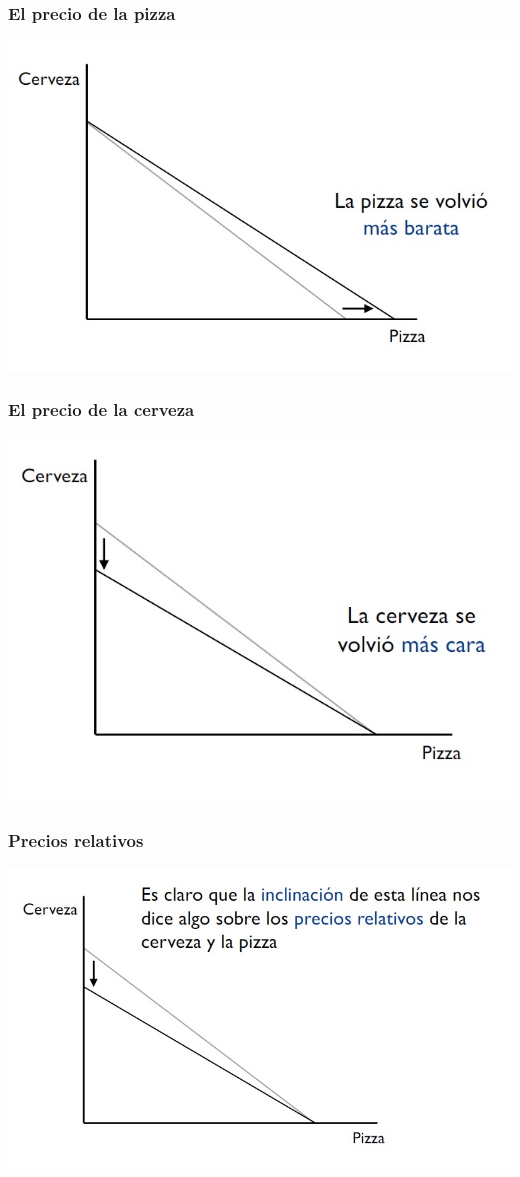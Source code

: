 \documentclass{beamer}
\begin{document}
\begin{frame}
\frametitle{El precio de la pizza}
\centering
\includegraphics[scale=0.6]{../Figures/Tema_02.6_rp4.jpg}
\end{frame}

\begin{frame}
\frametitle{El precio de la cerveza}
\centering
\includegraphics[scale=0.6]{../Figures/Tema_02.7_rp5.jpg}
\end{frame}

\begin{frame}
\frametitle{Precios relativos}
\centering
\includegraphics[scale=0.55]{../Figures/Tema_02.8_rp6.jpg}
\end{frame}
\end{document}
